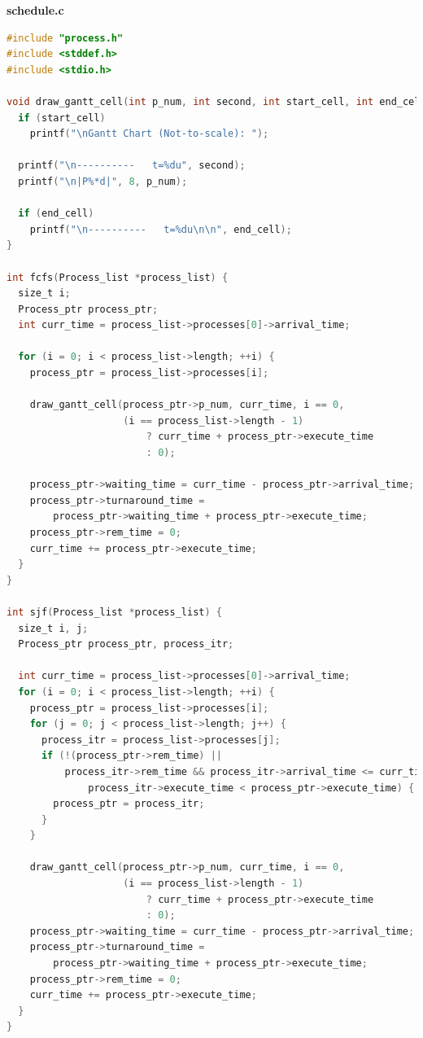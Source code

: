 \documentclass[13pt,oneside]{book}
\begin{document}
\Large\textbf{schedule.c}
\small
\begin{lstlisting}[language=C]
#include "process.h"
#include <stddef.h>
#include <stdio.h>

void draw_gantt_cell(int p_num, int second, int start_cell, int end_cell) {
  if (start_cell)
    printf("\nGantt Chart (Not-to-scale): ");

  printf("\n----------   t=%du", second);
  printf("\n|P%*d|", 8, p_num);

  if (end_cell)
    printf("\n----------   t=%du\n\n", end_cell);
}

int fcfs(Process_list *process_list) {
  size_t i;
  Process_ptr process_ptr;
  int curr_time = process_list->processes[0]->arrival_time;

  for (i = 0; i < process_list->length; ++i) {
    process_ptr = process_list->processes[i];

    draw_gantt_cell(process_ptr->p_num, curr_time, i == 0,
                    (i == process_list->length - 1)
                        ? curr_time + process_ptr->execute_time
                        : 0);

    process_ptr->waiting_time = curr_time - process_ptr->arrival_time;
    process_ptr->turnaround_time =
        process_ptr->waiting_time + process_ptr->execute_time;
    process_ptr->rem_time = 0;
    curr_time += process_ptr->execute_time;
  }
}

int sjf(Process_list *process_list) {
  size_t i, j;
  Process_ptr process_ptr, process_itr;

  int curr_time = process_list->processes[0]->arrival_time;
  for (i = 0; i < process_list->length; ++i) {
    process_ptr = process_list->processes[i];
    for (j = 0; j < process_list->length; j++) {
      process_itr = process_list->processes[j];
      if (!(process_ptr->rem_time) ||
          process_itr->rem_time && process_itr->arrival_time <= curr_time &&
              process_itr->execute_time < process_ptr->execute_time) {
        process_ptr = process_itr;
      }
    }

    draw_gantt_cell(process_ptr->p_num, curr_time, i == 0,
                    (i == process_list->length - 1)
                        ? curr_time + process_ptr->execute_time
                        : 0);
    process_ptr->waiting_time = curr_time - process_ptr->arrival_time;
    process_ptr->turnaround_time =
        process_ptr->waiting_time + process_ptr->execute_time;
    process_ptr->rem_time = 0;
    curr_time += process_ptr->execute_time;
  }
}


\end{lstlisting}
\end{document}
